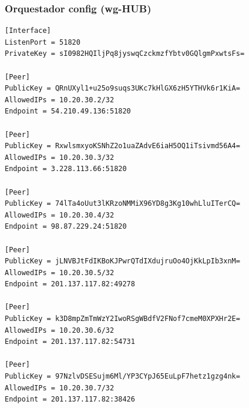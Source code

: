 \documentclass[11pt,a4paper]{article}
\begin{document}
\subsubsection*{Orquestador config (wg-HUB)}
\begin{lstlisting}
[Interface]
ListenPort = 51820
PrivateKey = sI0982HQIljPq8jyswqCzckmzfYbtv0GQlgmPxwtsFs=

[Peer]
PublicKey = QRnUXyl1+u25o9suqs3UKc7kHlGX6zH5YTHVk6r1KiA=
AllowedIPs = 10.20.30.2/32
Endpoint = 54.210.49.136:51820

[Peer]
PublicKey = RxwlsmxyoKSNhZ2o1uaZAdvE6iaH5OQ1iTsivmd56A4=
AllowedIPs = 10.20.30.3/32
Endpoint = 3.228.113.66:51820

[Peer]
PublicKey = 74lTa4oUut3lKRzoNMMiX96YD8g3Kg10whLluITerCQ=
AllowedIPs = 10.20.30.4/32
Endpoint = 98.87.229.24:51820

[Peer]
PublicKey = jLNVBJtFdIKBoKJPwrQTdIXdujruOo4OjKkLpIb3xnM=
AllowedIPs = 10.20.30.5/32
Endpoint = 201.137.117.82:49278

[Peer]
PublicKey = k3D8mpZmTmWzY2IwoRSgWBdfV2FNof7cmeM0XPXHr2E=
AllowedIPs = 10.20.30.6/32
Endpoint = 201.137.117.82:54731

[Peer]
PublicKey = 97NzlvDSESujm6Ml/YP3CYpJ65EuLpF7hetz1gzg4nk=
AllowedIPs = 10.20.30.7/32
Endpoint = 201.137.117.82:38426

\end{lstlisting}
\end{document}
